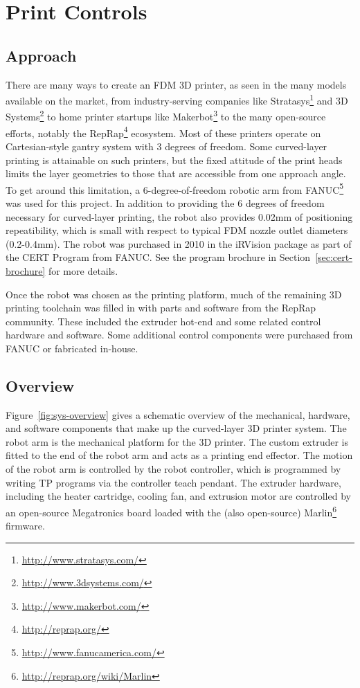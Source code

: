 \section{Print Controls}

\subsection{Approach}
There are many ways to create an FDM 3D printer, as seen in the many models available on the market, from industry-serving companies like Stratasys\footnote{\url{http://www.stratasys.com/}} and 3D Systems\footnote{\url{http://www.3dsystems.com/}} to home printer startups like Makerbot\footnote{\url{http://www.makerbot.com/}} to the many open-source efforts, notably the RepRap\footnote{\url{http://reprap.org/}} ecosystem. Most of these printers operate on Cartesian-style gantry system with 3 degrees of freedom. Some curved-layer printing is attainable on such printers, but the fixed attitude of the print heads limits the layer geometries to those that are accessible from one approach angle. To get around this limitation, a 6-degree-of-freedom robotic arm from FANUC\footnote{\url{http://www.fanucamerica.com/}} was used for this project. In addition to providing the 6 degrees of freedom necessary for curved-layer printing, the robot also provides 0.02mm of positioning repeatibility, which is small with respect to typical FDM nozzle outlet diameters (0.2-0.4mm). The robot was purchased in 2010 in the iRVision package as part of the CERT Program from FANUC. See the program brochure in Section~\ref{sec:cert-brochure} for more details.

Once the robot was chosen as the printing platform, much of the remaining 3D printing toolchain was filled in with parts and software from the RepRap community. These included the extruder hot-end and some related control hardware and software. Some additional control components were purchased from FANUC or fabricated in-house.

\subsection{Overview}
Figure~\ref{fig:sys-overview} gives a schematic overview of the mechanical, hardware, and software components that make up the curved-layer 3D printer system. The robot arm is the mechanical platform for the 3D printer. The custom extruder is fitted to the end of the robot arm and acts as a printing end effector. The motion of the robot arm is controlled by the robot controller, which is programmed by writing TP programs via the controller teach pendant. The extruder hardware, including the heater cartridge, cooling fan, and extrusion motor are controlled by an open-source Megatronics board loaded with the (also open-source) Marlin\footnote{\url{http://reprap.org/wiki/Marlin}} firmware. 


